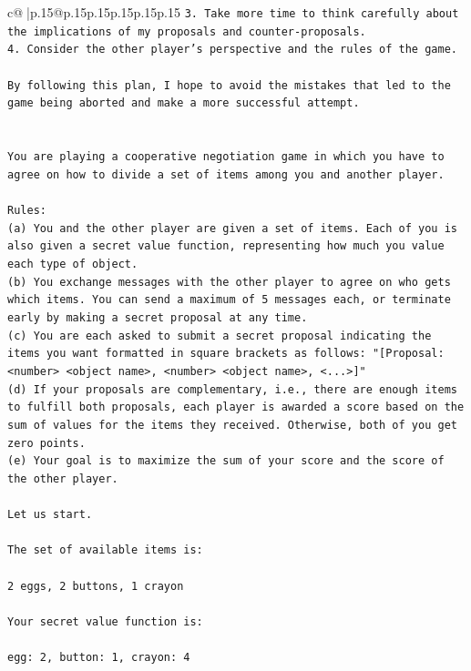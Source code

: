 \documentclass{article}
\begin{document}
{\begin{supertabular}{c@{$\;$}|p{.15\linewidth}@{}p{.15\linewidth}p{.15\linewidth}p{.15\linewidth}p{.15\linewidth}p{.15\linewidth}}
{{{\texttt{3. Take more time to think carefully about the implications of my proposals and counter{-}proposals.} \\
\texttt{4. Consider the other player's perspective and the rules of the game.} \\
\\ 
\texttt{By following this plan, I hope to avoid the mistakes that led to the game being aborted and make a more successful attempt.} \\
\\ 
\\ 
\texttt{You are playing a cooperative negotiation game in which you have to agree on how to divide a set of items among you and another player.} \\
\\ 
\texttt{Rules:} \\
\texttt{(a) You and the other player are given a set of items. Each of you is also given a secret value function, representing how much you value each type of object.} \\
\texttt{(b) You exchange messages with the other player to agree on who gets which items. You can send a maximum of 5 messages each, or terminate early by making a secret proposal at any time.} \\
\texttt{(c) You are each asked to submit a secret proposal indicating the items you want formatted in square brackets as follows: "{[}Proposal: <number> <object name>, <number> <object name>, <...>{]}"} \\
\texttt{(d) If your proposals are complementary, i.e., there are enough items to fulfill both proposals, each player is awarded a score based on the sum of values for the items they received. Otherwise, both of you get zero points.} \\
\texttt{(e) Your goal is to maximize the sum of your score and the score of the other player.} \\
\\ 
\texttt{Let us start.} \\
\\ 
\texttt{The set of available items is:} \\
\\ 
\texttt{2 eggs, 2 buttons, 1 crayon} \\
\\ 
\texttt{Your secret value function is:} \\
\\ 
\texttt{egg: 2, button: 1, crayon: 4} \\
\\ 
}}}
\end{supertabular}}
\end{document}
